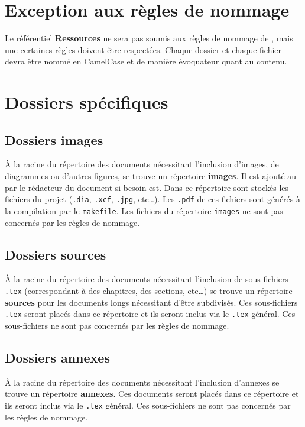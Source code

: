 \section{Exception aux règles de nommage}

Le référentiel \textbf{Ressources} ne sera pas soumis aux règles de nommage de \nomEquipe{}, mais une certaines règles doivent être respectées. Chaque dossier et chaque fichier devra être nommé en CamelCase et de manière évoquateur quant au contenu. 

\section{Dossiers spécifiques}

\subsection{Dossiers images}

\`{A} la racine du répertoire des documents nécessitant l'inclusion d'images, de diagrammes ou
d'autres figures, se trouve un répertoire \textbf{images}. Il est ajouté au \git{} par le
rédacteur du document si besoin est. Dans ce répertoire sont stockés les fichiers du projet
(\verb+.dia+, \verb+.xcf+, \verb+.jpg+, etc\dots). Les \verb+.pdf+ de ces fichiers sont générés
à la compilation par le \verb+makefile+.
Les fichiers du répertoire \verb+images+ ne sont pas concernés par les règles de nommage.

\subsection{Dossiers sources}

\`{A} la racine du répertoire des documents nécessitant l'inclusion de sous-fichiers \verb+.tex+
(correspondant à des chapitres, des sections, etc\dots) se trouve un répertoire \textbf{sources} pour
les documents longs nécessitant d'être subdivisés. 
Ces sous-fichiers \verb+.tex+ seront placés dans ce répertoire et ils seront inclus via
le \verb+.tex+ général. Ces sous-fichiers ne sont pas concernés par les règles de nommage.

\subsection{Dossiers annexes}

\`{A} la racine du répertoire des documents nécessitant l'inclusion d'annexes se trouve un répertoire \textbf{annexes}.
Ces documents seront placés dans ce répertoire et ils seront inclus via
le \verb+.tex+ général. Ces sous-fichiers ne sont pas concernés par les règles de nommage.

